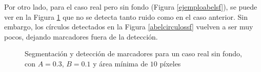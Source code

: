 Por otro lado, para el caso real pero sin fondo (Figura \ref{ejemploabelsf}), se puede ver en la Figura \ref{ejemploabel} que no se detecta tanto ruido como en el caso anterior. Sin embargo, los círculos detectados en la Figura \ref{abelcirculossf} vuelven a ser muy pocos, dejando marcadores fuera de la detección.

\begin{figure}[ht!]
        \hspace{-1cm}
        \hspace{5 mm}
  \caption{Segmentación y detección de marcadores para un caso real sin fondo, con $A=0.3$, $B=0.1$ y área mínima de $10$ píxeles}
      \label{ejemploabel}
\end{figure}

